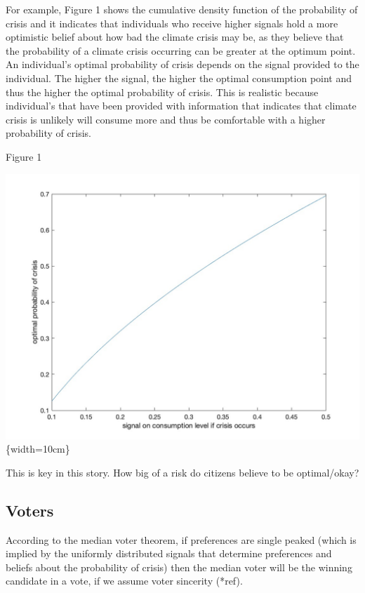 \documentclass[11pt,preprint, authoryear]{elsarticle}
\numberwithin{equation}{section}
\numberwithin{figure}{section}
\numberwithin{table}{section}
\begin{document}
For example, Figure 1 shows the cumulative density function of the
probability of crisis and it indicates that individuals who receive
higher signals hold a more optimistic belief about how bad the climate
crisis may be, as they believe that the probability of a climate crisis
occurring can be greater at the optimum point. An individual's optimal
probability of crisis depends on the signal provided to the individual.
The higher the signal, the higher the optimal consumption point and thus
the higher the optimal probability of crisis. This is realistic because
individual's that have been provided with information that indicates
that climate crisis is unlikely will consume more and thus be
comfortable with a higher probability of crisis.

\begin{center}
Figure 1
\end{center}

\includegraphics{images/Figure1base.jpg}\{width=10cm\}

This is key in this story. How big of a risk do citizens believe to be
optimal/okay?

\hypertarget{voters}{%
\subsection*{Voters}\label{voters}}

According to the median voter theorem, if preferences are single peaked
(which is implied by the uniformly distributed signals that determine
preferences and beliefs about the probability of crisis) then the median
voter will be the winning candidate in a vote, if we assume voter
sincerity (*ref).
\end{document}
